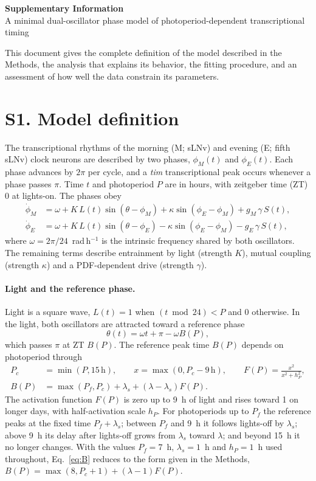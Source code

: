 \documentclass[10pt,a4paper]{article}
\begin{document}
\begin{center}
{\Large\bfseries Supplementary Information}\\[5pt]
{\large A minimal dual-oscillator phase model of photoperiod-dependent
transcriptional timing}
\end{center}

This document gives the complete definition of the model described in the
Methods, the analysis that explains its behavior, the fitting procedure,
and an assessment of how well the data constrain its parameters.

\section*{S1. Model definition}
The transcriptional rhythms of the morning (M; sLNv) and evening (E; fifth
sLNv) clock neurons are described by two phases, $\phi_M(t)$ and
$\phi_E(t)$. Each phase advances by $2\pi$ per cycle, and a \textit{tim}
transcriptional peak occurs whenever a phase passes $\pi$. Time $t$ and
photoperiod $P$ are in hours, with zeitgeber time (ZT) 0 at lights-on.
The phases obey
\begin{align}
 \dot\phi_M&=\omega+K\,L(t)\sin(\theta-\phi_M)
              +\kappa\sin(\phi_E-\phi_M)+g_M\,\gamma\,S(t),\label{eq:M}\\
 \dot\phi_E&=\omega+K\,L(t)\sin(\theta-\phi_E)
              -\kappa\sin(\phi_E-\phi_M)-g_E\,\gamma\,S(t),\label{eq:E}
\end{align}
where $\omega=2\pi/24$~rad\,h$^{-1}$ is the intrinsic frequency shared
by both oscillators. The remaining terms describe entrainment by light
(strength $K$), mutual coupling (strength $\kappa$) and a PDF-dependent
drive (strength $\gamma$).

\paragraph{Light and the reference phase.}
Light is a square wave, $L(t)=1$ when $(t\bmod24)<P$ and $0$ otherwise.
In the light, both oscillators are attracted toward a reference phase
\begin{equation}
 \theta(t)=\omega t+\pi-\omega B(P),\label{eq:theta}
\end{equation}
which passes $\pi$ at ZT $B(P)$. The reference peak time $B(P)$ depends on
photoperiod through
\begin{align}
 P_c&=\min(P,15\,\mathrm{h}),\qquad
 x=\max(0,P_c-9\,\mathrm{h}),\qquad
 F(P)=\frac{x^2}{x^2+h_P^2},\label{eq:activation}\\
 B(P)&=\max(P_f,P_c)+\lambda_s+(\lambda-\lambda_s)F(P).\label{eq:B}
\end{align}
The activation function $F(P)$ is zero up to 9~h of light and rises
toward 1 on longer days, with half-activation scale $h_P$. For
photoperiods up to $P_f$ the reference peaks at the fixed time
$P_f+\lambda_s$; between $P_f$ and 9~h it follows lights-off by
$\lambda_s$; above 9~h its delay after lights-off grows from $\lambda_s$
toward $\lambda$; and beyond 15~h it no longer changes. With the values
$P_f=7$~h, $\lambda_s=1$~h and $h_P=1$~h used throughout,
Eq.~\eqref{eq:B} reduces to the form given in the Methods,
$B(P)=\max(8,P_c+1)+(\lambda-1)F(P)$.
\end{document}

